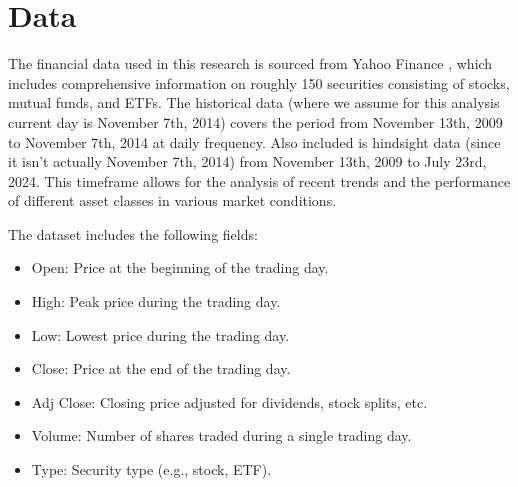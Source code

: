 \section{Data}
The financial data used in this research is sourced from Yahoo Finance \citep{yfinance}, which includes comprehensive information on roughly 150 securities consisting of stocks, mutual funds, and ETFs. The historical data (where we assume for this analysis current day is November 7th, 2014) covers the period from November 13th, 2009 to November 7th, 2014 at daily frequency. Also included is hindsight data (since it isn't actually November 7th, 2014) from November 13th, 2009 to July 23rd, 2024. This timeframe allows for the analysis of recent trends and the performance of different asset classes in various market conditions.

The dataset includes the following fields:
\begin{itemize}
    \item Open: Price at the beginning of the trading day.
    \item High: Peak price during the trading day.
    \item Low: Lowest price during the trading day.
    \item Close: Price at the end of the trading day.
    \item Adj Close: Closing price adjusted for dividends, stock splits, etc.
    \item Volume: Number of shares traded during a single trading day.
    \item Type: Security type (e.g., stock, ETF).
\end{itemize}

\newpage
